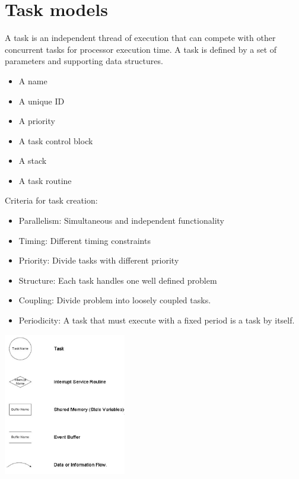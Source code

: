 \section{Task models}

A task is an independent thread of execution that can compete with
other concurrent tasks for processor execution time.
A task is defined by a set of parameters and supporting data structures.

\begin{itemize}
	\item A name
	\item A unique ID
	\item A priority
	\item A task control block
	\item A stack
	\item A task routine
\end{itemize}



Criteria for task creation:

\begin{itemize}
	\item{Parallelism: Simultaneous and independent functionality}
	\item{Timing: Different timing constraints}
	\item{Priority: Divide tasks with different priority}
	\item{Structure: Each task handles one well defined problem}
	\item{Coupling: Divide problem into loosely coupled tasks.}
	\item{Periodicity: A task that must execute with a fixed period is a task by itself.}
\end{itemize}

\begin{center}
	\includegraphics[width=0.4\textwidth]{images/taskDiagramComponents.png}
\end{center}

